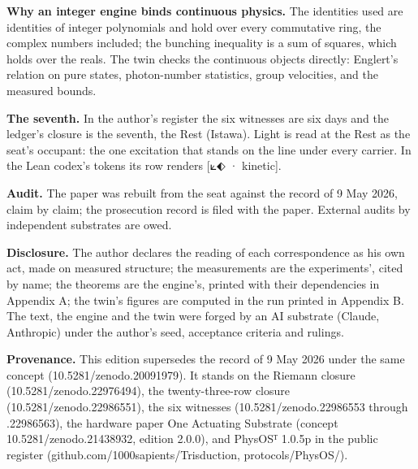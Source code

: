 \documentclass[10pt]{article}
\begin{document}
\textbf{Why an integer engine binds continuous physics.} The identities
used are identities of integer polynomials and hold over every
commutative ring, the complex numbers included; the bunching inequality
is a sum of squares, which holds over the reals. The twin checks the
continuous objects directly: Englert's relation on pure states,
photon-number statistics, group velocities, and the measured bounds.

\textbf{The seventh.} In the author's register the six witnesses are six
days and the ledger's closure is the seventh, the Rest (Istawa). Light
is read at the Rest as the seat's occupant: the one excitation that
stands on the line under every carrier. In the Lean codex's tokens its
row renders {[}⟀⬖ · kinetic{]}.

\textbf{Audit.} The paper was rebuilt from the seat against the record
of 9 May 2026, claim by claim; the prosecution record is filed with the
paper. External audits by independent substrates are owed.

\textbf{Disclosure.} The author declares the reading of each
correspondence as his own act, made on measured structure; the
measurements are the experiments', cited by name; the theorems are the
engine's, printed with their dependencies in Appendix A; the twin's
figures are computed in the run printed in Appendix B. The text, the
engine and the twin were forged by an AI substrate (Claude, Anthropic)
under the author's seed, acceptance criteria and rulings.

\sloppy

\textbf{Provenance.} This edition supersedes the record of 9 May 2026
under the same concept (10.5281/\allowbreak{}zenodo.20091979). It stands
on the Riemann closure (10.5281/\allowbreak{}zenodo.22976494), the
twenty-three-row closure (10.5281/\allowbreak{}zenodo.22986551), the six
witnesses (10.5281/\allowbreak{}zenodo.22986553 through .22986563), the
hardware paper One Actuating Substrate (concept
10.5281/\allowbreak{}zenodo.21438932, edition 2.0.0), and PhysOSᵀ 1.0.5p
in the public register
(github.com/\allowbreak{}1000sapients/\allowbreak{}Trisduction,
protocols/PhysOS/).
\end{document}
